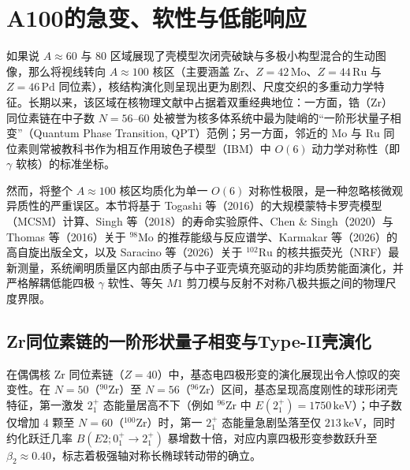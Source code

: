 \section{A100的急变、软性与低能响应}\label{sec:4-3}

如果说 $A\approx 60$ 与 $80$ 区域展现了壳模型次闭壳破缺与多极小构型混合的生动图像，那么将视线转向 $A\approx 100$ 核区（主要涵盖 $\mathrm{Zr}$、$Z=42\,\mathrm{Mo}$、$Z=44\,\mathrm{Ru}$ 与 $Z=46\,\mathrm{Pd}$ 同位素），核结构演化则呈现出更为剧烈、尺度交织的多重动力学特征。长期以来，该区域在核物理文献中占据着双重经典地位：一方面，锆（$\mathrm{Zr}$）同位素链在中子数 $N=56\text{--}60$ 处被誉为核多体系统中最为陡峭的``一阶形状量子相变''（Quantum Phase Transition, QPT）范例；另一方面，邻近的 $\mathrm{Mo}$ 与 $\mathrm{Ru}$ 同位素则常被教科书作为相互作用玻色子模型（IBM）中 $O(6)$ 动力学对称性（即 $\gamma$ 软核）的标准坐标。

然而，将整个 $A\approx 100$ 核区均质化为单一 $O(6)$ 对称性极限，是一种忽略核微观异质性的严重误区。本节将基于 Togashi 等（2016）\cite{doctoral-r1-g28-togashi-2016-zr-mcsm-qpt}的大规模蒙特卡罗壳模型（MCSM）计算、Singh 等（2018）\cite{doctoral-r1-g28-singh-2018-98zr-lifetimes}的寿命实验原件、Chen \& Singh（2020）\cite{chen-singh-2020-nds-98mo}与 Thomas 等（2016）\cite{thomas-2016-96-98mo-coexistence}关于 $^{98}\mathrm{Mo}$ 的推荐能级与反应谱学、Karmakar 等（2026）\cite{karmakar-2026-98mo-octupole}的高自旋出版全文，以及 Saracino 等（2026）\cite{saracino-2026-102ru-scissors-octupole-resonances}关于 $^{102}\mathrm{Ru}$ 的核共振荧光（NRF）最新测量，系统阐明质量区内部由质子与中子亚壳填充驱动的非均质势能面演化，并严格解耦低能四极 $\gamma$ 软性、等矢 $M1$ 剪刀模与反射不对称八极共振之间的物理尺度界限。

\subsection{Zr同位素链的一阶形状量子相变与Type-II壳演化}\label{sec:4-3-1}

在偶偶核 $\mathrm{Zr}$ 同位素链（$Z=40$）中，基态电四极形变的演化展现出令人惊叹的突变性。在 $N=50$（$^{90}\mathrm{Zr}$）至 $N=56$（$^{96}\mathrm{Zr}$）区间，基态呈现高度刚性的球形闭壳特征，第一激发 $2^+_1$ 态能量居高不下（例如 $^{96}\mathrm{Zr}$ 中 $E(2^+_1) = 1750\,\mathrm{keV}$）；中子数仅增加 4 颗至 $N=60$（$^{100}\mathrm{Zr}$）时，第一 $2^+_1$ 态能量急剧坠落至仅 $213\,\mathrm{keV}$，同时约化跃迁几率 $B(E2; 0^+_1 \to 2^+_1)$ 暴增数十倍，对应内禀四极形变参数跃升至 $\beta_2 \approx 0.40$，标志着极强轴对称长椭球转动带的确立。


